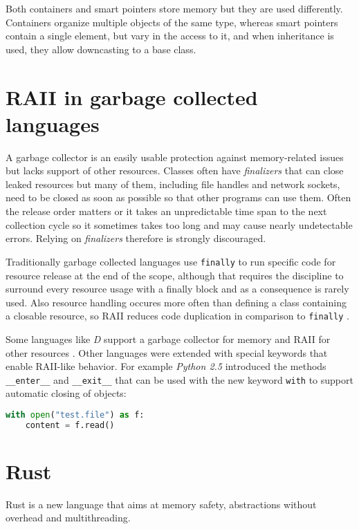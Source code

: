 \documentclass[conference,twocolumn]{IEEEtran}
\begin{document}
Both containers and smart pointers store memory but they are used differently. Containers organize multiple objects of the same type, whereas smart pointers contain a single element, but vary in the access to it, and when inheritance is used, they allow downcasting to a base class.


\section{RAII in garbage collected languages}
A garbage collector is an easily usable protection against memory-related issues but lacks support of other resources. Classes often have \emph{finalizers} that can close leaked resources but many of them, including file handles and network sockets, need to be closed as soon as possible so that other programs can use them. Often the release order matters or it takes an unpredictable time span to the next collection cycle so it sometimes takes too long and may cause nearly undetectable errors. Relying on \emph{finalizers} therefore is strongly discouraged.

Traditionally garbage collected languages use \verb|finally| to run specific code for resource release at the end of the scope, although that requires the discipline to surround every resource usage with a finally block and as a consequence is rarely used. Also resource handling occures more often than defining a class containing a closable resource, so RAII reduces code duplication in comparison to \verb|finally| \cite{isoCppFAQ}.

Some languages like \emph{D} support a garbage collector for memory and RAII for other resources \cite{DLangProgramming}. Other languages were extended with special keywords that enable RAII-like behavior. For example \emph{Python 2.5} \cite{pythonDoc} introduced the methods \verb|__enter__| and \verb|__exit__| that can be used with the new keyword \verb|with| to support automatic closing of objects:
\begin{lstlisting}[language=python,frame=single]
with open("test.file") as f:
    content = f.read()
\end{lstlisting}


\section{Rust}
Rust is a new language that aims at memory safety, abstractions without overhead and multithreading. \cite{RustBook}
\end{document}
